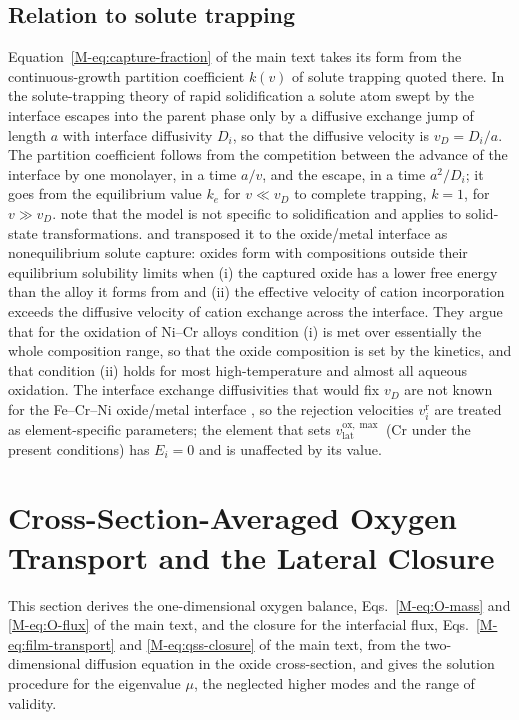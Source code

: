 \documentclass[12pt]{article}
\newcommand{\lat}{\mathrm{lat}}
\newcommand{\ox}{\mathrm{ox}}
\begin{document}
\subsection{Relation to solute trapping}

Equation~\eqref{M-eq:capture-fraction} of the main text takes its form from
the continuous-growth partition coefficient \(k(v)\) of solute trapping quoted
there. In the solute-trapping theory of rapid solidification
\parencite{aziz1982model,aziz1988continuous} a solute atom swept by the
interface escapes into the parent phase only by a diffusive exchange jump of
length \(a\) with interface diffusivity \(D_i\), so that the diffusive
velocity is \(v_D=D_i/a\). The partition coefficient follows from the
competition between the advance of the interface by one monolayer, in a time
\(a/v\), and the escape, in a time \(a^{2}/D_i\); it goes from the equilibrium
value \(k_e\) for \(v\ll v_D\) to complete trapping, \(k=1\), for
\(v\gg v_D\). \textcite{aziz1988continuous} note that the model is not
specific to solidification and applies to solid-state transformations.
\textcite{yu2018nonequilibrium} and \textcite{sherman2019thermodynamics}
transposed it to the oxide/metal interface as nonequilibrium solute capture:
oxides form with compositions outside their equilibrium solubility limits when
(i) the captured oxide has a lower free energy than the alloy it forms from
and (ii) the effective velocity of cation incorporation exceeds the diffusive
velocity of cation exchange across the interface. They argue that for the
oxidation of Ni--Cr alloys condition (i) is met over essentially the whole
composition range, so that the oxide composition is set by the kinetics, and
that condition (ii) holds for most high-temperature and almost all aqueous
oxidation. The interface exchange diffusivities that would fix \(v_D\) are not
known for the Fe--Cr--Ni oxide/metal interface
\parencite{yu2018nonequilibrium}, so the rejection velocities
\(v_i^{\mathrm{r}}\) are treated as element-specific parameters; the element
that sets \(v_{\lat}^{\ox,\max}\) (Cr under the present conditions) has
\(E_i=0\) and is unaffected by its value.

\section{Cross-Section-Averaged Oxygen Transport and the Lateral Closure}
\label{sec:si-closure}

This section derives the one-dimensional oxygen balance,
Eqs.~\eqref{M-eq:O-mass} and \eqref{M-eq:O-flux} of the main text, and the
closure for the interfacial flux, Eqs.~\eqref{M-eq:film-transport} and
\eqref{M-eq:qss-closure} of the main text, from the two-dimensional diffusion
equation in the oxide cross-section, and gives the solution procedure for the
eigenvalue \(\mu\), the neglected higher modes and the range of validity.
\end{document}
